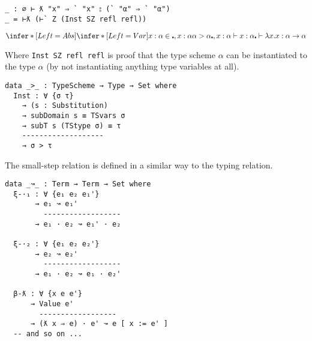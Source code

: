 \begin{listing}[H]
  \centering
  \begin{minipage}{0.6\linewidth}
    \begin{verbatim}
_ : ∅ ⊢ ƛ "x" ⇒ ` "x" ⦂ (` "α" ⇒ ` "α")
_ = ⊢ƛ (⊢` Z (Inst SZ refl refl))
    \end{verbatim}
  \end{minipage}%
  \begin{minipage}{0.4\linewidth}
    \[
      \infer*[Left=Abs]{
        \infer*[Left=Var]{
          x : \alpha \in \centerdot, x : \alpha \\
          \alpha > \alpha
        }{
          \centerdot , x : \alpha \vdash x : \alpha
        }
      }
      {\centerdot \vdash \lambda x . x : \alpha \rightarrow \alpha}
    \]
  \end{minipage}
\end{listing}
Where \texttt{Inst SZ refl refl} is proof that the type
scheme $\alpha$ can be instantiated to the type $\alpha$ (by not instantiating
anything type variables at all).
\begin{verbatim}
data _>_ : TypeScheme → Type → Set where
  Inst : ∀ {σ τ}
    → (s : Substitution)
    → subDomain s ≡ TSvars σ
    → subT s (TStype σ) ≡ τ
    -------------------
    → σ > τ
\end{verbatim}

\begin{samepage}
The small-step relation is defined in a similar way to the typing
relation.
\begin{verbatim}
data _↝_ : Term → Term → Set where
  ξ-·₁ : ∀ {e₁ e₂ e₁'}
       → e₁ ↝ e₁'
         ------------------
       → e₁ · e₂ ↝ e₁' · e₂
       
  ξ-·₂ : ∀ {e₁ e₂ e₂'}
       → e₂ ↝ e₂'
         ------------------
       → e₁ · e₂ ↝ e₁ · e₂'

  β-ƛ : ∀ {x e e'}
      → Value e'
        ------------------
      → (ƛ x ⇒ e) · e' ↝ e [ x := e' ]
  -- and so on ...
\end{verbatim}
\end{samepage}


